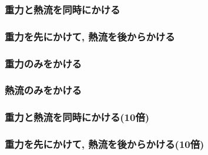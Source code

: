 \subsubsection{重力と熱流を同時にかける}



\subsubsection{重力を先にかけて, 熱流を後からかける}



\subsubsection{重力のみをかける}



\subsubsection{熱流のみをかける}



\subsubsection{重力と熱流を同時にかける(10倍)}



\subsubsection{重力を先にかけて, 熱流を後からかける(10倍)}



